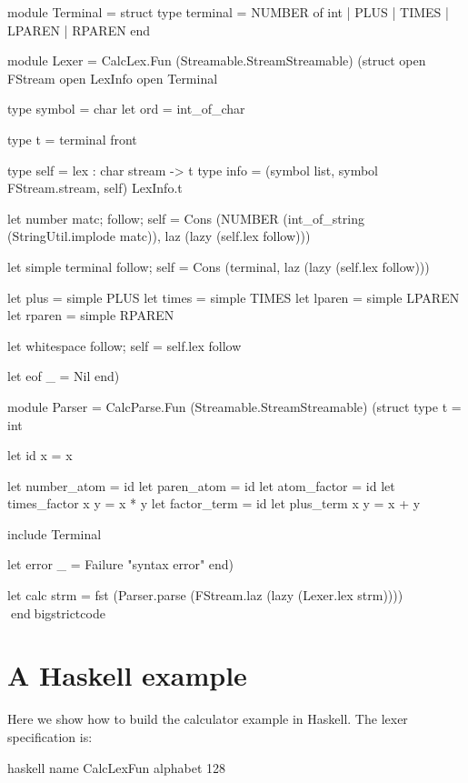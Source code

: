 \documentclass[10pt]{article}
\begin{document}
\begin{strictcode}
\begin{strictcode}
\begin{strictcode}
\begin{strictcode}
\begin{strictcode}
\begin{strictcode}
\begin{strictcode}
\begin{strictcode}
\begin{strictcode}
\begin{strictcode}
\begin{strictcode}
\begin{strictcode}
\begin{strictcode}
\begin{bigstrictcode}
\begin{strictcode}
\begin{strictcode}
\begin{bigstrictcode}
module Terminal =
   struct
      type terminal =
         NUMBER of int
       | PLUS
       | TIMES
       | LPAREN
       | RPAREN
   end

module Lexer =
   CalcLex.Fun
   (Streamable.StreamStreamable)
   (struct
       open FStream
       open LexInfo
       open Terminal

       type symbol = char
       let ord = int_of_char

       type t = terminal front

       type self = { lex : char stream -> t }
       type info = (symbol list, symbol FStream.stream, self) LexInfo.t

       let number { matc; follow; self } =
         Cons (NUMBER (int_of_string (StringUtil.implode matc)),
               laz (lazy (self.lex follow)))

       let simple terminal { follow; self } =
         Cons (terminal, laz (lazy (self.lex follow)))

       let plus = simple PLUS
       let times = simple TIMES
       let lparen = simple LPAREN
       let rparen = simple RPAREN

       let whitespace { follow; self } =
         self.lex follow

       let eof _ = Nil
     end)

module Parser =
   CalcParse.Fun
   (Streamable.StreamStreamable)
   (struct
       type t = int

       let id x = x

       let number_atom = id
       let paren_atom = id
       let atom_factor = id
       let times_factor x y = x * y
       let factor_term = id
       let plus_term x y = x + y

       include Terminal

       let error _ = Failure "syntax error"
     end)

let calc strm = fst (Parser.parse (FStream.laz (lazy (Lexer.lex strm))))
endbigstrictcode



\section{A Haskell example}
\label{sec:example-hs}

Here we show how to build the calculator example in Haskell.  The
lexer specification is:

\begin{code}
haskell
name CalcLexFun
alphabet 128


\end{code}
\end{bigstrictcode}
\end{strictcode}
\end{strictcode}
\end{bigstrictcode}
\end{strictcode}
\end{strictcode}
\end{strictcode}
\end{strictcode}
\end{strictcode}
\end{strictcode}
\end{strictcode}
\end{strictcode}
\end{strictcode}
\end{strictcode}
\end{strictcode}
\end{strictcode}
\end{strictcode}
\end{document}
